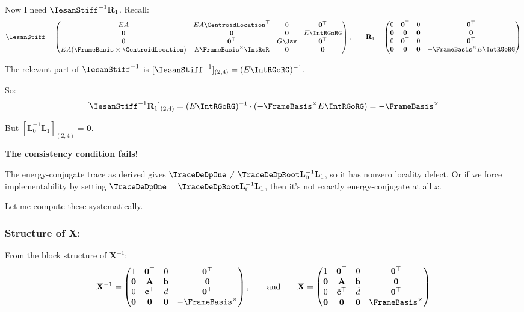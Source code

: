 Now I need \(\IesanStiff^{-1}\mathbf{R}_1\). Recall:
\[
\IesanStiff = \begin{pmatrix}
EA & EA\CentroidLocation^\top & 0 & \mathbf{0}^\top \\
\mathbf{0} & \mathbf{0} & \mathbf{0} & E\IntRGoRG \\
0 & \mathbf{0}^\top & G\Jsv & \mathbf{0}^\top \\
EA(\FrameBasis\times\CentroidLocation) & E\FrameBasis^\times\IntRoR & \mathbf{0} & \mathbf{0}
\end{pmatrix},
\qquad 
\mathbf{R}_1 = \begin{pmatrix}
0 & \mathbf{0}^\top & 0 & \mathbf{0}^\top \\
\mathbf{0} & \mathbf{0} & \mathbf{0} & \mathbf{0} \\
0 & \mathbf{0}^\top & 0 & \mathbf{0}^\top \\
\mathbf{0} & \mathbf{0} & \mathbf{0} & -\FrameBasis^\times E\IntRGoRG
\end{pmatrix}
\]


The relevant part of \(\IesanStiff^{-1}\) is
\([\IesanStiff^{-1}]_{(2,4)} = (E\IntRGoRG)^{-1}\).

So:
\[[\IesanStiff^{-1}\mathbf{R}_1]_{(2,4)} = (E\IntRGoRG)^{-1} \cdot (-\FrameBasis^\times E\IntRGoRG) = -\FrameBasis^\times\]

But \([\mathbf{L}_0^{-1}\mathbf{L}_1]_{(2,4)} = \mathbf{0}\).

\textbf{The consistency condition fails!}


The energy-conjugate trace as derived gives
\(\TraceDeDpOne \neq \TraceDeDpRoot \mathbf{L}_0^{-1}\mathbf{L}_1\), so it
has nonzero locality defect. Or if we force implementability by setting
\(\TraceDeDpOne = \TraceDeDpRoot \mathbf{L}_0^{-1}\mathbf{L}_1\), then it's
not exactly energy-conjugate at all \(x\).

Let me compute these systematically.

\subsubsection{Structure of X:}

From the block structure of \(\mathbf{X}^{-1}\):
\[\mathbf{X}^{-1} = \begin{pmatrix}
1 & \mathbf{0}^\top & 0 & \mathbf{0}^\top \\
\mathbf{0} & \mathbf{A} & \mathbf{b} & \mathbf{0} \\
0 & \mathbf{c}^\top & d & \mathbf{0}^\top \\
\mathbf{0} & \mathbf{0} & \mathbf{0} & -\FrameBasis^\times
\end{pmatrix},
\qquad\text{and}\qquad 
\mathbf{X} = \begin{pmatrix}
1 & \mathbf{0}^\top & 0 & \mathbf{0}^\top \\
\mathbf{0} & \tilde{\mathbf{A}} & \tilde{\mathbf{b}} & \mathbf{0} \\
0 & \tilde{\mathbf{c}}^\top & \tilde{d} & \mathbf{0}^\top \\
\mathbf{0} & \mathbf{0} & \mathbf{0} & \FrameBasis^\times
\end{pmatrix}
\]

